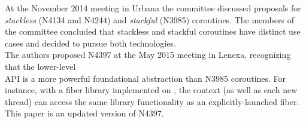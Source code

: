 At the November 2014 meeting in Urbana the committee discussed proposals for
\emph{stackless} (N4134\cite{N4134} and N4244\cite{N4244}) and \emph{stackful}
(N3985\cite{N3985}) coroutines. The members of the committee concluded that
stackless and stackful coroutines have distinct use cases and decided to pursue
both technologies.\\
\newline
The authors proposed N4397\cite{N4397} at the May 2015 meeting in Lenexa,
recognizing that the lower-level\\
 API is a more
powerful foundational abstraction than N3985 coroutines. For instance, with a
fiber library implemented on , the 
context (as well as each new thread) can access the same library functionality
as an explicitly-launched fiber.\\
\newline
This paper is an updated version of N4397.
